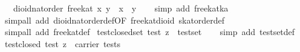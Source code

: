 \begin{isabellebody}
\ \ \ {}dioid{}nat{}order\ free{}kat\ x\ y\ {}\ {}x\ {}\ y{}{}\isanewline
%
\isadelimproof
\ \ %
\endisadelimproof
%
\isatagproof
{}\isamarkupfalse%
\ {}simp\ add{}\ free{}kat{}ka{}\isanewline
\ \ \isamarkupfalse%
\ {}simp{}all\ add{}\ dioid{}nat{}order{}def{}OF\ free{}kat{}dioid{}\ skat{}order{}def{}\isanewline
\ \ \isamarkupfalse%
\ {}simp{}all\ add{}\ free{}kat{}def{}%
\endisatagproof
{\isafoldproof}%
%
\isadelimproof
\isanewline
%
\endisadelimproof
\isanewline
{}\isamarkupfalse%
\ test{}closed{}set{}\ {}test\ z\ {}\ test{}set{}\isanewline
%
\isadelimproof
\ \ %
\endisadelimproof
%
\isatagproof
{}\isamarkupfalse%
\ {}simp\ add{}\ test{}set{}def{}%
\endisatagproof
{\isafoldproof}%
%
\isadelimproof
\isanewline
%
\endisadelimproof
\isanewline
{}\isamarkupfalse%
\ test{}closed{}\ {}test\ z\ {}\ carrier\ tests{}\isanewline

\end{isabellebody}
